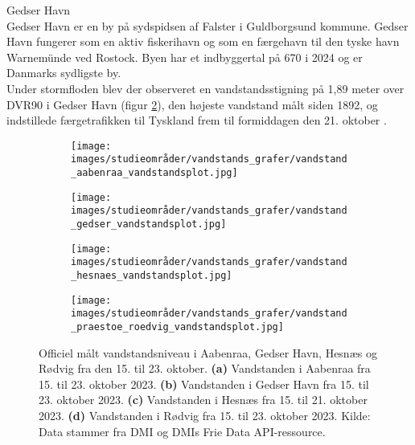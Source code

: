 {\large Gedser Havn}\\
Gedser Havn er en by på sydspidsen af Falster i Guldborgsund kommune. Gedser Havn fungerer som en aktiv fiskerihavn og som en færgehavn til den tyske havn Warnemünde ved Rostock. Byen har et indbyggertal på 670 i 2024 \citep{danmarks_statistisk_mobile_nodate} og er Danmarks sydligste by. \\
Under stormfloden blev der observeret en vandstandsstigning på 1,89 meter over DVR90 i Gedser Havn (figur \ref{Subfig: Gedser vandstand}), den højeste vandstand målt siden 1892, og indstillede færgetrafikken til Tyskland frem til formiddagen den 21. oktober \citep{tiirikainen_sadan_2023}.\\
\begin{figure}[H]
    \begin{subfigure}[b]{0.5\textwidth}
        \centering
        \texttt{[image: images/studieområder/vandstands\_grafer/vandstand\_aabenraa\_vandstandsplot.jpg]}
        \caption{}
        \label{Subfig: Aabenraa vandstand}
    \end{subfigure}
    \hspace{0.2cm}
    \begin{subfigure}[b]{0.5\textwidth}
        \centering
        \texttt{[image: images/studieområder/vandstands\_grafer/vandstand\_gedser\_vandstandsplot.jpg]}
        \caption{}
        \label{Subfig: Gedser vandstand}
    \end{subfigure}
    \vspace{0.2cm}
    \begin{subfigure}[b]{0.5\textwidth}
        \centering
        \texttt{[image: images/studieområder/vandstands\_grafer/vandstand\_hesnaes\_vandstandsplot.jpg]}
        \caption{}
        \label{Subfig: Hesnæs vandstand}
    \end{subfigure}
    \hspace{0.2cm}
    \begin{subfigure}[b]{0.5\textwidth}
        \centering
        \texttt{[image: images/studieområder/vandstands\_grafer/vandstand\_praestoe\_roedvig\_vandstandsplot.jpg]}
        \caption{}
        \label{Subfig: Rødvig vandstand}
    \end{subfigure}
    \caption{Officiel målt vandstandsniveau i Aabenraa, Gedser Havn, Hesnæs og Rødvig fra den 15. til 23. oktober. \textbf{(a)} Vandstanden i Aabenraa fra 15. til 23. oktober 2023. \textbf{(b)} Vandstanden i Gedser Havn fra 15. til 23. oktober 2023. \textbf{(c)} Vandstanden i Hesnæs fra 15. til 21. oktober 2023. \textbf{(d)} Vandstanden i Rødvig fra 15. til 23. oktober 2023. Kilde: Data stammer fra DMI og DMIs Frie Data API-ressource.}
    \label{Figur: Vandstandsdata}
\end{figure}
